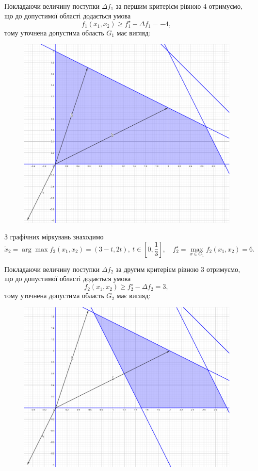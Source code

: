 \begin{solution}
    Покладаючи величину поступки $\Delta f_1$ за першим критерієм рівною $4$ отримуємо, що до допустимої області додається умова \[ f_1(x_1, x_2) \ge f_1^\star - \Delta f_1 = -4, \] тому уточнена допустима область $G_1$ має вигляд:
    \begin{figure}[H]
        \centering
        \includegraphics[width=\textwidth]{successive_concessions_2_2.png}
    \end{figure}

    З графічних міркувань знаходимо \[ \tilde x_2 = \arg \max f_2(x_1, x_2) = (3 - t, 2 t), \ t \in \left[0, \frac13\right], \quad f_2^\star = \max_{x \in G_1} f_2(x_1, x_2) = 6. \]

    Покладаючи величину поступки $\Delta f_2$ за другим критерієм рівною $3$ отримуємо, що до допустимої області додається умова \[ f_2(x_1, x_2) \ge f_2^\star - \Delta f_2 = 3, \] тому уточнена допустима область $G_2$ має вигляд:
    \begin{figure}[H]
        \centering
        \includegraphics[width=\textwidth]{successive_concessions_2_3.png}
    \end{figure}


\end{solution}
